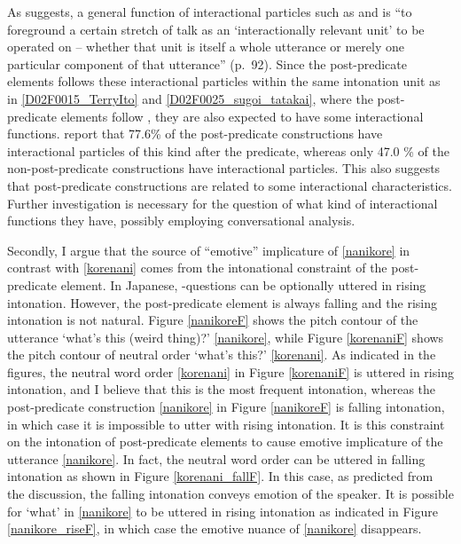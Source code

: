 As  suggests,
a general function of interactional particles such as  and  is ``to foreground a certain stretch of talk as an `interactionally relevant unit' to be operated on
-- whether that unit is itself a whole utterance or merely one particular component of that utterance'' (p.~92).
Since the post-predicate elements follows these interactional particles within the same intonation unit as in \ref{D02F0015_TerryIto} and \ref{D02F0025_sugoi_tatakai},
where the post-predicate elements follow ,
they are also expected to have some interactional functions.
 report that
77.6\% of the post-predicate constructions have interactional particles of this kind after the predicate,
whereas only 47.0 \% of the non-post-predicate constructions have interactional particles.
This also suggests that post-predicate constructions are related to
some interactional characteristics.
Further investigation is necessary for the question of what kind of interactional functions they have,
possibly employing conversational analysis.

Secondly,
I argue that 
the source of ``emotive'' implicature of \ref{nanikore} in contrast with \ref{korenani} comes from the intonational constraint of the post-predicate element.
In Japanese, -questions can be optionally uttered in rising intonation.
However, the post-predicate element is always falling and the rising intonation is not natural.
Figure \ref{nanikoreF} shows the pitch contour of the utterance  `what's this (weird thing)?' \ref{nanikore},
while Figure \ref{korenaniF} shows the pitch contour of neutral order  `what's this?' \ref{korenani}.
As indicated in the figures, the neutral word order \ref{korenani} in Figure \ref{korenaniF} is uttered in rising intonation,
and I believe that this is the most frequent intonation,
whereas the post-predicate construction \ref{nanikore} in Figure \ref{nanikoreF} is falling intonation,
in which case it is impossible to utter  with rising intonation.
It is this constraint on the intonation of post-predicate elements to cause emotive implicature of the utterance \ref{nanikore}.
In fact, the neutral word order  can be uttered in falling intonation as shown in Figure \ref{korenani_fallF}.
In this case, as predicted from the discussion, the falling intonation conveys emotion of the speaker.
It is possible for  `what' in \ref{nanikore} to be uttered in rising intonation as indicated in Figure \ref{nanikore_riseF},
in which case the emotive nuance of \ref{nanikore} disappears.


